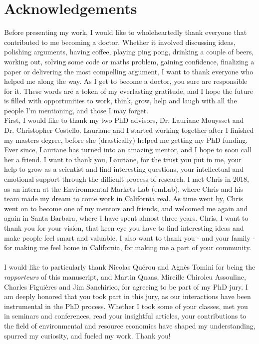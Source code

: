 \chapter*{Acknowledgements}
\onehalfspacing

Before presenting my work, I would like to wholeheartedly thank everyone that contributed to me becoming a doctor. Whether it involved discussing ideas, polishing arguments, having coffee, playing ping pong, drinking a couple of beers, working out, solving some code or maths problem, gaining confidence, finalizing a paper or delivering the most compelling argument, I want to thank everyone who helped me along the way. As I get to become a doctor, you sure are responsible for it. These words are a token of my everlasting gratitude, and I hope the future is filled with opportunities to work, think, grow, help and laugh with all the people I'm mentioning, and those I may forget. 
\\

First, I would like to thank my two PhD advisors, Dr. Lauriane Mouysset and Dr. Christopher Costello. Lauriane and I started working together after I finished my masters degree, before she (drastically) helped me getting my PhD funding. Ever since, Lauriane has turned into an amazing mentor, and I hope to soon call her a friend. I want to thank you, Lauriane, for the trust you put in me, your help to grow as a scientist and find interesting questions, your intellectual and emotional support through the difficult process of research. 
%
I met Chris in 2018, as an intern at the Environmental Markets Lab (emLab), where Chris and his team made my dream to come work in California real. As time went by, Chris went on to become one of my mentors and friends, and welcomed me again and again in Santa Barbara, where I have spent almost three years. Chris, I want to thank you for your vision, that keen eye you have to find interesting ideas and make people feel smart and valuable. I also want to thank you - and your family - for making me feel home in California, for making me a part of your community.
\\\\
I would like to particularly thank Nicolas Quérou and Agnès Tomini for being the \textit{rapporteurs} of this manuscript, and Martin Quaas, Mireille Chiroleu Assouline, Charles Figuières and Jim Sanchirico, for agreeing to be part of my PhD jury. I am deeply honored that you took part in this jury, as our interactions have been instrumental in the PhD process. Whether I took some of your classes, met you in seminars and conferences, read your insightful articles, your contributions to the field of environmental and resource economics have shaped my understanding, spurred my curiosity, and fueled my work. Thank you!
\\\\

